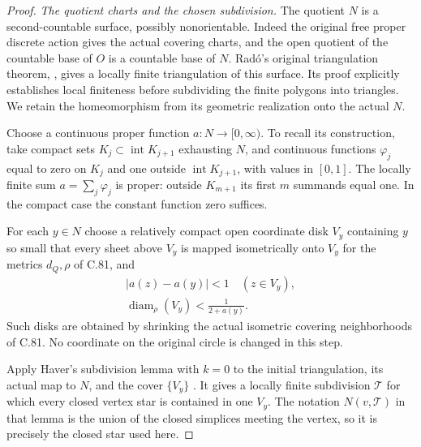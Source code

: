 \begin{proof}
\emph{The quotient charts and the chosen subdivision.}
The quotient $N$ is a second-countable surface,
possibly nonorientable. Indeed the original
free proper discrete action gives the actual
covering charts, and the open quotient of the
countable base of $O$ is a countable base of $N$.
Rad\'o's original triangulation theorem,
\cite[\S3, Hilfssatz 2, pp.~111--114]{C_RadoTriangulation},
gives a locally finite triangulation of this
surface. Its proof explicitly establishes
local finiteness before subdividing the finite
polygons into triangles. We retain the
homeomorphism from its geometric realization
onto the actual $N$.

Choose a continuous proper function
$a:N\to[0,\infty)$. To recall its construction,
take compact sets $K_j\subset\operatorname{int}K_{j+1}$
exhausting $N$, and continuous functions
$\varphi_j$ equal to zero on $K_j$ and one
outside $\operatorname{int}K_{j+1}$, with values
in $[0,1]$. The locally finite sum
$a=\sum_j\varphi_j$ is proper: outside $K_{m+1}$
its first $m$ summands equal one. In the compact
case the constant function zero suffices.

For each $y\in N$ choose a relatively compact
open coordinate disk $V_y$ containing $y$ so
small that every sheet above $V_y$ is mapped
isometrically onto $V_y$ for the metrics
$d_Q,\rho$ of C.81, and
\[
 \begin{gathered}
 |a(z)-a(y)|<1\quad(z\in V_y),\\
 \operatorname{diam}_{\rho}(V_y)<\frac1{2+a(y)}.
 \end{gathered}
                                                               \tag{C.82.3}
\]
Such disks are obtained by shrinking the
actual isometric covering neighborhoods of
C.81. No coordinate on the original circle
is changed in this step.

Apply Haver's subdivision lemma with $k=0$
to the initial triangulation, its actual map
to $N$, and the cover $\{V_y\}$
\cite[Lemma 1, p.~458]{C_Haver1975}.
It gives a locally finite subdivision
$\mathcal T$ for which every closed vertex
star is contained in one $V_y$. The notation
$N(v,\mathcal T)$ in that lemma is the union
of the closed simplices meeting the vertex,
so it is precisely the closed star used here.


\end{proof}
